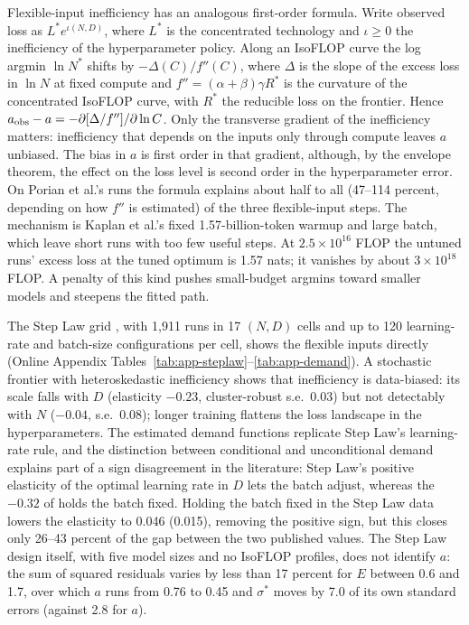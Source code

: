 Flexible-input inefficiency has an analogous first-order formula. Write observed loss as $L^*e^{\iota(N,D)}$, where
$L^*$ is the concentrated technology and $\iota\ge0$ the inefficiency of the hyperparameter policy. Along an IsoFLOP
curve the log argmin $\ln N^*$ shifts by $-\Delta(C)/f''(C)$, where $\Delta$ is the slope of the excess loss in $\ln N$ at fixed
compute and $f''=(\alpha+\beta)\gamma R^*$ is the curvature of the concentrated IsoFLOP curve, with $R^*$ the reducible
loss on the frontier. Hence $a_{\rm obs}-a=-\partial[\Delta/f'']/\partial\ln C$. Only the transverse gradient of the
inefficiency matters: inefficiency that depends on the inputs only through compute leaves $a$ unbiased. The bias in
$a$ is first order in that gradient, although, by the envelope theorem, the effect on the loss level is second order
in the hyperparameter error. On Porian et al.'s runs the formula explains about half to all (47--114 percent,
depending on how $f''$ is estimated) of the three flexible-input steps. The mechanism is Kaplan et al.'s fixed
1.57-billion-token warmup and large batch, which leave short runs with too few useful steps. At $2.5\times10^{16}$
FLOP the untuned runs' excess loss at the tuned optimum is 1.57 nats; it vanishes by about $3\times10^{18}$ FLOP. A
penalty of this kind pushes small-budget argmins toward smaller models and steepens the fitted path.

The Step Law grid \citep{li2025predictablea}, with 1,911 runs in 17 $(N,D)$ cells and up to 120 learning-rate and
batch-size configurations per cell, shows the flexible inputs directly (Online Appendix Tables~\ref{tab:app-steplaw}--\ref{tab:app-demand}). A stochastic frontier with
heteroskedastic inefficiency \citep{aigner1977formulation,caudill1995frontier} shows that inefficiency is data-biased:
its scale falls with $D$ (elasticity $-0.23$, cluster-robust s.e.\ 0.03) but not detectably with $N$ ($-0.04$, s.e.\
0.08); longer training flattens the loss landscape in the hyperparameters. The estimated demand functions replicate
Step Law's learning-rate rule, and the distinction between conditional and unconditional demand
\citep{milgrom1996lechatelier} explains part of a sign disagreement in the literature: Step Law's positive elasticity
of the optimal learning rate in $D$ lets the batch adjust, whereas the $-0.32$ of \citet{bjorck2024scaling} holds the
batch fixed. Holding the batch fixed in the Step Law data lowers the elasticity to 0.046 (0.015), removing the
positive sign, but this closes only 26--43 percent of the gap between the two published values. The Step Law design
itself, with five model sizes and no IsoFLOP profiles, does not identify $a$: the sum of squared residuals varies by
less than 17 percent for $E$ between 0.6 and 1.7, over which $a$ runs from 0.76 to 0.45 and $\sigma^*$ moves by 7.0 of
its own standard errors (against 2.8 for $a$).

